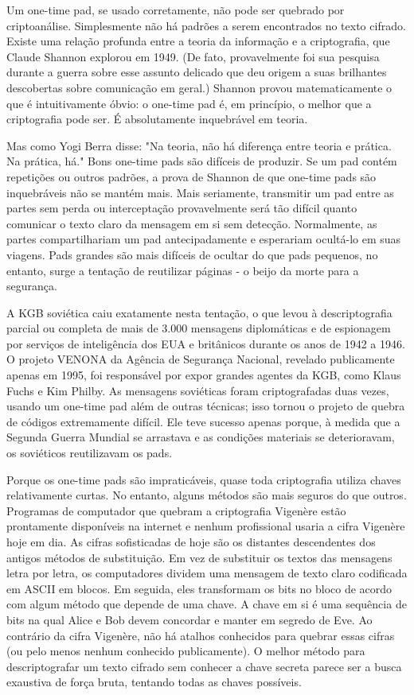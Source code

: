 \documentclass{book}
\begin{document}
Um one-time pad, se usado corretamente, não pode ser quebrado por criptoanálise. Simplesmente não há padrões a serem encontrados no texto cifrado. Existe uma relação profunda entre a teoria da informação e a criptografia, que Claude Shannon explorou em 1949. (De fato, provavelmente foi sua pesquisa durante a guerra sobre esse assunto delicado que deu origem a suas brilhantes descobertas sobre comunicação em geral.) Shannon provou matematicamente o que é intuitivamente óbvio: o one-time pad é, em princípio, o melhor que a criptografia pode ser. É absolutamente inquebrável em teoria.

Mas como Yogi Berra disse: "Na teoria, não há diferença entre teoria e prática. Na prática, há." Bons one-time pads são difíceis de produzir. Se um pad contém repetições ou outros padrões, a prova de Shannon de que one-time pads são inquebráveis não se mantém mais. Mais seriamente, transmitir um pad entre as partes sem perda ou interceptação provavelmente será tão difícil quanto comunicar o texto claro da mensagem em si sem detecção. Normalmente, as partes compartilhariam um pad antecipadamente e esperariam ocultá-lo em suas viagens. Pads grandes são mais difíceis de ocultar do que pads pequenos, no entanto, surge a tentação de reutilizar páginas - o beijo da morte para a segurança.

A KGB soviética caiu exatamente nesta tentação, o que levou à descriptografia parcial ou completa de mais de 3.000 mensagens diplomáticas e de espionagem por serviços de inteligência dos EUA e britânicos durante os anos de 1942 a 1946. O projeto VENONA da Agência de Segurança Nacional, revelado publicamente apenas em 1995, foi responsável por expor grandes agentes da KGB, como Klaus Fuchs e Kim Philby. As mensagens soviéticas foram criptografadas duas vezes, usando um one-time pad além de outras técnicas; isso tornou o projeto de quebra de códigos extremamente difícil. Ele teve sucesso apenas porque, à medida que a Segunda Guerra Mundial se arrastava e as condições materiais se deterioravam, os soviéticos reutilizavam os pads.

Porque os one-time pads são impraticáveis, quase toda criptografia utiliza chaves relativamente curtas. No entanto, alguns métodos são mais seguros do que outros. Programas de computador que quebram a criptografia Vigenère estão prontamente disponíveis na internet e nenhum profissional usaria a cifra Vigenère hoje em dia. As cifras sofisticadas de hoje são os distantes descendentes dos antigos métodos de substituição. Em vez de substituir os textos das mensagens letra por letra, os computadores dividem uma mensagem de texto claro codificada em ASCII em blocos. Em seguida, eles transformam os bits no bloco de acordo com algum método que depende de uma chave. A chave em si é uma sequência de bits na qual Alice e Bob devem concordar e manter em segredo de Eve. Ao contrário da cifra Vigenère, não há atalhos conhecidos para quebrar essas cifras (ou pelo menos nenhum conhecido publicamente). O melhor método para descriptografar um texto cifrado sem conhecer a chave secreta parece ser a busca exaustiva de força bruta, tentando todas as chaves possíveis.
\end{document}
